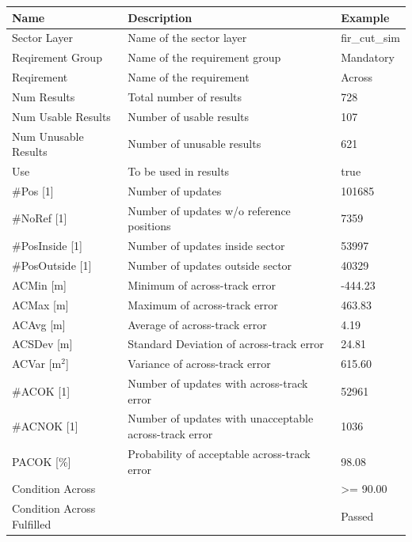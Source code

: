 \begin{center}
 \begin{table}[H]
  \begin{tabularx}{\textwidth}{ | l | X |  l | }
    \hline
    \textbf{Name} & \textbf{Description} & \textbf{Example} \\ \hline
    Sector Layer & Name of the sector layer & fir\_cut\_sim \\ \hline
    Reqirement Group & Name of the requirement group & Mandatory \\ \hline
    Reqirement & Name of the requirement & Across \\ \hline
    Num Results & Total number of results & 728 \\ \hline
    Num Usable Results & Number of usable results & 107 \\ \hline
    Num Unusable Results & Number of unusable results & 621 \\ \hline
    Use & To be used in results & true \\ \hline
    \#Pos [1] & Number of updates & 101685 \\ \hline
    \#NoRef [1] & Number of updates w/o reference positions & 7359 \\ \hline
    \#PosInside [1] & Number of updates inside sector & 53997 \\ \hline
    \#PosOutside [1] & Number of updates outside sector & 40329 \\ \hline
    ACMin [m] & Minimum of across-track error & -444.23 \\ \hline
    ACMax [m] & Maximum of across-track error & 463.83 \\ \hline
    ACAvg [m] & Average of across-track error & 4.19 \\ \hline
    ACSDev [m] & Standard Deviation of across-track error & 24.81 \\ \hline
    ACVar [m$^2$] & Variance of across-track error & 615.60 \\ \hline
    \#ACOK [1] & Number of updates with across-track error & 52961 \\ \hline
    \#ACNOK [1] & Number of updates with unacceptable across-track error  & 1036 \\ \hline
    PACOK [\%] & Probability of acceptable across-track error & 98.08 \\ \hline
    Condition Across &  & >= 90.00 \\ \hline
    Condition Across Fulfilled &  & Passed \\ \hline
\end{tabularx}
\end{table}
\end{center}

